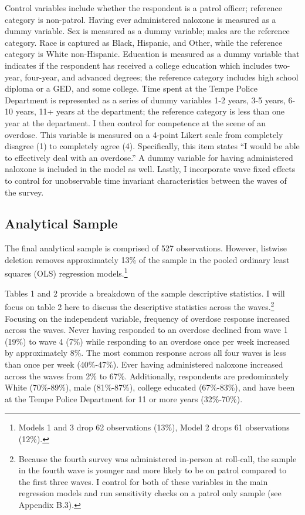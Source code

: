 Control variables include whether the respondent is a patrol officer; reference category is non-patrol. Having ever administered naloxone is measured as a dummy variable. Sex is measured as a dummy variable; males are the reference category. Race is captured as Black, Hispanic, and Other, while the reference category is White non-Hispanic. Education is measured as a dummy variable that indicates if the respondent has received a college education which includes two-year, four-year, and advanced degrees; the reference category includes high school diploma or a GED, and some college. Time spent at the Tempe Police Department is represented as a series of dummy variables 1-2 years, 3-5 years, 6-10 years, 11+ years at the department; the reference category is less than one year at the department. I then control for competence at the scene of an overdose. This variable is measured on a 4-point Likert scale from completely disagree (1) to completely agree (4). Specifically, this item states “I would be able to effectively deal with an overdose.” A dummy variable for having administered naloxone is included in the model as well. Lastly, I incorporate wave fixed effects to control for unobservable time invariant characteristics between the waves of the survey.

\subsection{Analytical Sample}

The final analytical sample is comprised of 527 observations. However, listwise deletion removes approximately 13\% of the sample in the pooled ordinary least squares (OLS) regression models.\footnote{Models 1 and 3 drop 62 observations (13\%), Model 2 drops 61 observations (12\%).} 

Tables 1 and 2 provide a breakdown of the sample descriptive statistics. I will focus on table 2 here to discuss the descriptive statistics across the waves.\footnote{Because the fourth survey was administered in-person at roll-call, the sample in the fourth wave is younger and more likely to be on patrol compared to the first three waves. I control for both of these variables in the main regression models and run sensitivity checks on a patrol only sample (see Appendix B.3).} Focusing on the independent variable, frequency of overdose response increased across the waves. Never having responded to an overdose declined from wave 1 (19\%) to wave 4 (7\%) while responding to an overdose once per week increased by approximately 8\%. The most common response across all four waves is less than once per week (40\%-47\%). Ever having administered naloxone increased across the waves from 2\% to 67\%. Additionally, respondents are predominately White (70\%-89\%), male (81\%-87\%), college educated (67\%-83\%), and have been at the Tempe Police Department for 11 or more years (32\%-70\%).

